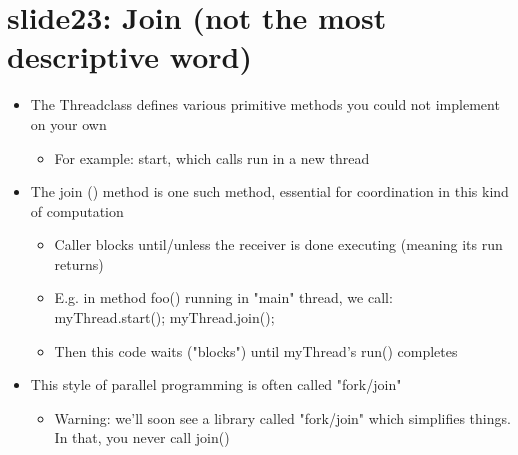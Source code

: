 \documentclass[12pt, a4paper]{book}
\begin{document}
\section{slide23: Join (not the most descriptive word)}
\begin{itemize}
    \item The Threadclass defines various primitive methods you could not implement on your own
          \begin{itemize}
              \item For example: start, which calls run in a new thread
          \end{itemize}
    \item The join () method is one such method, essential for coordination in this kind of computation
          \begin{itemize}
              \item Caller blocks until/unless the receiver is done executing (meaning its run returns)
              \item E.g. in method foo() running in "main" thread, we call:\\
                    myThread.start(); myThread.join();
              \item Then this code waits ("blocks") until myThread's run() completes
          \end{itemize}
    \item This style of parallel programming is often called "fork/join"
          \begin{itemize}
              \item Warning: we'll soon see a library called "fork/join" which simplifies things. In that, you never call join()
          \end{itemize}
\end{itemize}
\end{document}
